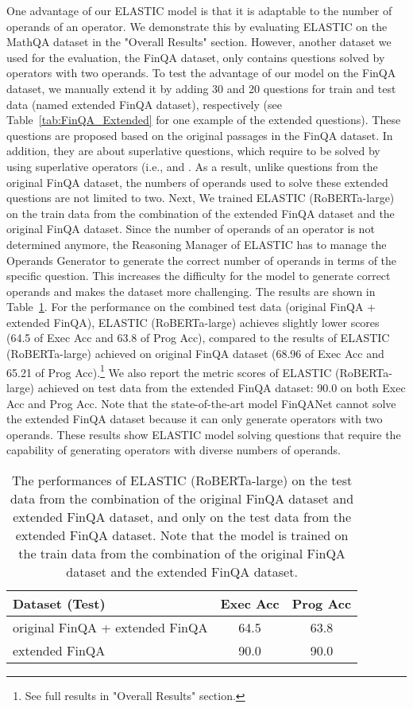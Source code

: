 \documentclass{article}
\begin{document}
One advantage of our ELASTIC model is that it is adaptable to the number of operands of an operator. We demonstrate this by evaluating ELASTIC on the MathQA dataset in the "Overall Results" section. However, another dataset we used for the evaluation, the FinQA dataset, only contains questions solved by operators with two operands. To test the advantage of our model on the FinQA dataset, we manually extend it by adding 30 and 20 questions for train and test data (named extended FinQA dataset), respectively (see Table~\ref{tab:FinQA_Extended} for one example of the extended questions). These questions are proposed based on the original passages in the FinQA dataset. In addition, they are about superlative questions, which require to be solved by using superlative operators (i.e.,  and . As a result, unlike questions from the original FinQA dataset, the numbers of operands used to solve these extended questions are not limited to two. Next, We trained ELASTIC (RoBERTa-large) on the train data from the combination of the extended FinQA dataset and the original FinQA dataset. Since the number of operands of an operator is not determined anymore, the Reasoning Manager of ELASTIC has to manage the Operands Generator to generate the correct number of operands in terms of the specific question. This increases the difficulty for the model to generate correct operands and makes the dataset more challenging. The results are shown in Table~\ref{tab:FinQA-Most}. For the performance on the combined test data (original FinQA + extended FinQA), ELASTIC (RoBERTa-large) achieves slightly lower scores (64.5 of Exec Acc and 63.8 of Prog Acc), compared to the results of ELASTIC (RoBERTa-large) achieved on original FinQA dataset (68.96 of Exec Acc and 65.21 of Prog Acc).\footnote{See full results in "Overall Results" section.} We also report the metric scores of ELASTIC (RoBERTa-large) achieved on test data from the extended FinQA dataset: 90.0 on both Exec Acc and Prog Acc. Note that the state-of-the-art model FinQANet cannot solve the extended FinQA dataset because it can only generate operators with two operands. These results show ELASTIC model solving questions that require the capability of generating operators with diverse numbers of operands. 

\begin{table}[tbhp!]
\centering
\caption{The performances of ELASTIC (RoBERTa-large) on the test data from the combination of the original FinQA dataset and extended FinQA dataset, and only on the test data from the extended FinQA dataset. Note that the model is trained on the train data from the combination of the original FinQA dataset and the extended FinQA dataset.}
\label{tab:FinQA-Most}
\begin{tabular}{@{}lcc@{}}
\toprule
Dataset (Test)             & Exec Acc & Prog Acc \\ \midrule
original FinQA + extended FinQA  & 64.5     & 63.8     \\ 
extended FinQA  & 90.0    & 90.0     \\ \bottomrule
\end{tabular}
\end{table}
\end{document}
